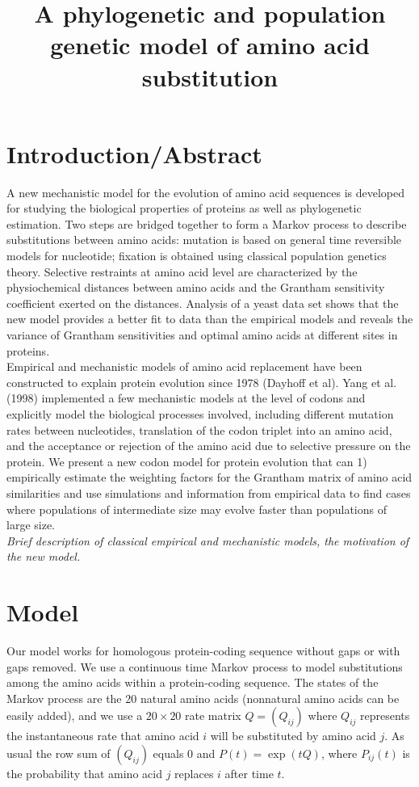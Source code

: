 \documentclass[13pt]{article}
\title{A phylogenetic and population genetic model of amino acid substitution}
\author{}
\begin{document}
\maketitle
\section{Introduction/Abstract}
A new mechanistic model for the evolution of amino acid sequences is developed for studying the biological properties of proteins as well as phylogenetic estimation.  Two steps are bridged together to form a Markov process to describe substitutions between amino acids: mutation is based on general time reversible models for nucleotide; fixation is obtained using classical population genetics theory. Selective restraints at amino acid level are characterized by the physiochemical distances between amino acids and the Grantham sensitivity coefficient exerted on the distances. Analysis of a yeast data set shows that the new model provides a better fit to data than the empirical models and reveals the variance of Grantham sensitivities and optimal amino acids at different sites in proteins.\\

Empirical and mechanistic models of amino acid replacement have been constructed to explain protein evolution since 1978 (Dayhoff et al). Yang et al. (1998) implemented a few mechanistic models at the level of codons and explicitly model the biological processes involved, including different mutation rates between nucleotides, translation of the codon triplet into an amino acid, and the acceptance or rejection of the amino acid due to selective pressure on the protein. We present a new codon model for protein evolution that can 1) empirically estimate the weighting factors for the Grantham matrix of amino acid similarities and use simulations and information from empirical data to find cases where populations of intermediate size may evolve faster than populations of large size.\\

\textit{Brief description of classical empirical and mechanistic models, the motivation of the new model.}
\section{Model}
Our model works for homologous protein-coding sequence without gaps or with gaps removed. We use a continuous time Markov process to model substitutions among the amino acids within a protein-coding sequence. The states of the Markov process are the 20 natural amino acids (nonnatural amino acids can be easily added), and we use a $20 \times 20$ rate matrix $Q=(Q_{ij})$ where $Q_{ij}$ represents the instantaneous rate that amino acid $i$ will be substituted by amino acid $j$. As usual the row sum of $(Q_{ij})$ equals $0$ and $P(t) = \exp (tQ)$, where $P_{ij}(t)$ is the probability that amino acid $j$ replaces $i$ after time $t$. \\
\end{document}
